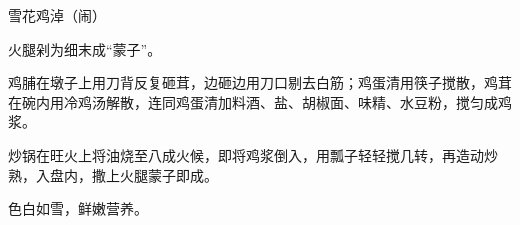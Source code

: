 \begin{recipe}{雪花鸡淖（闹）}

\ingredients



\cooking

\step 火腿剁为细末成“蒙子”。

\step 鸡脯在墩子上用刀背反复砸茸，边砸边用刀口剔去白筋；鸡蛋清用筷子搅散，鸡茸在碗内用冷鸡汤解散，连同鸡蛋清加料酒、盐、胡椒面、味精、水豆粉，搅匀成鸡浆。

\step 炒锅在旺火上将油烧至八成火候，即将鸡浆倒入，用瓢子轻轻搅几转，再造动炒熟，入盘内，撒上火腿蒙子即成。

\notes

色白如雪，鲜嫩营养。

\end{recipe}

